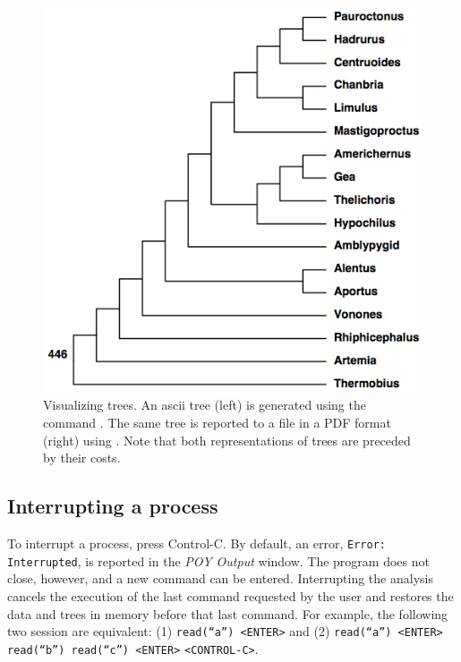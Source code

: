\begin{figure}
\begin{minipage}[c]{0.5\textwidth}
	   	\includegraphics[width=\textwidth]{doc/figures/pstree.jpg}
   	\end{minipage}
\caption{Visualizing trees. An ascii tree (left) is generated using the command
. The same tree is reported to a file in a PDF format (right) using . Note that both representations of trees  are preceded by their costs.}
\label{fig:trees}
\end{figure}

\subsection{Interrupting a process}
To interrupt a process, press Control-C. By default, an error, \texttt{Error:}\\ \texttt{Interrupted}, is reported in the \emph{POY Output} window. The program does not close, however, and a new command can be entered. Interrupting the analysis cancels the execution of the last command requested by the user and restores the data and trees in memory before that last command. For example, the following two session are equivalent: (1) \texttt{read(``a'') <ENTER>} and (2) \texttt{read(``a'') <ENTER>} \texttt{read(``b'') read(``c'') <ENTER>} \texttt{<CONTROL-C>}.

